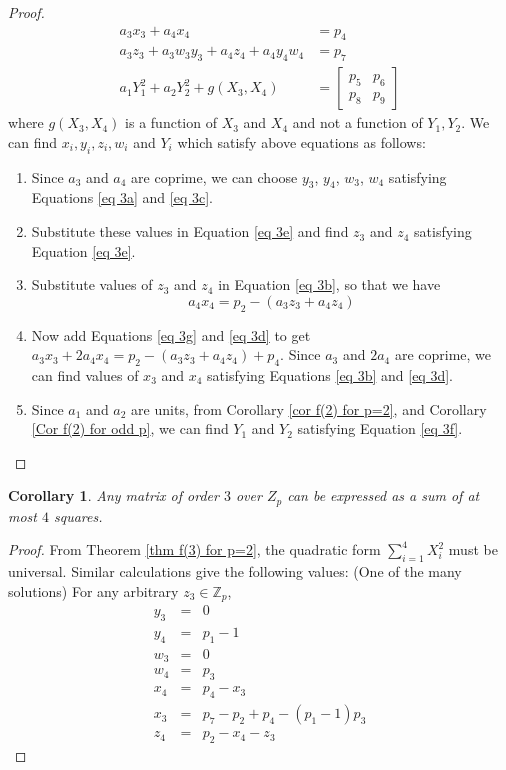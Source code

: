 \documentclass[12pt,a4paper]{article}
\newtheorem{cor}{Corollary}[section]
\begin{document}
\begin{proof}
\begin{subequations}
\begin{align}
					a_3x_3 + a_4x_4 &= p_4 \label{eq 3d} \\
					a_3z_3 + a_3w_3y_3 + a_4z_4 + a_4y_4w_4 &= p_7 \label{eq 3e} \\
					a_1Y_1^2 + a_2Y_2^2 + g(X_3, X_4) &= \begin{bmatrix}
						p_5 & p_6 \\
						p_8 & p_9
					\end{bmatrix} \label{eq 3f}
				\end{align}
			\end{subequations}
			where $g(X_3, X_4)$ is a function of $X_3$ and $X_4$ and not a function of $Y_1, Y_2$. We can find $x_i, y_i, z_i, w_i$ and $Y_i$ which satisfy above equations as follows:
			\begin{enumerate}
				\item[(a)] Since $a_3$ and $a_4$ are coprime, we can choose $y_3$, $y_4$, $w_3$, $w_4$ satisfying Equations \eqref{eq 3a} and \eqref{eq 3c}.
				\item[(b)] Substitute these values in Equation \eqref{eq 3e} and find $z_3$ and $z_4$ satisfying Equation \eqref{eq 3e}.
				\item[(c)] Substitute values of $z_3$ and $z_4$ in Equation \eqref{eq 3b}, so that we have
				\begin{equation}
					a_4x_4 = p_2-(a_3z_3+a_4z_4)  \label{eq 3g}
				\end{equation}
				\item[(d)] Now add Equations \eqref{eq 3g} and \eqref{eq 3d} to get $a_3x_3 + 2 a_4x_4 = p_2-(a_3z_3+a_4z_4) + p_4$. Since $a_3$ and $2a_4$ are coprime, we can find values of $x_3$ and $x_4$ satisfying Equations \eqref{eq 3b} and \eqref{eq 3d}.
				\item[(e)] Since $a_1$ and $a_2$ are units, from Corollary \ref{cor f(2) for p=2}, and Corollary \ref{Cor f(2) for odd p}, we can find $Y_1$ and $Y_2$ satisfying Equation \eqref{eq 3f}.
			\end{enumerate}
	\end{proof}
	\begin{cor}
		Any matrix of order $3$ over $Z_p$ can be expressed as a sum of at most $4$ squares.
	\end{cor}
	\begin{proof}
		From Theorem \ref{thm f(3) for p=2}, the quadratic form $\sum_{i=1}^{4} X_i^2$ must be universal. Similar calculations give the following values: (One of the many solutions) For any arbitrary $z_3 \in \mathbb{Z}_p$,
		\begin{eqnarray*}
			y_3&=& 0 \\
			y_4 &=& p_1-1 \\
			w_3&=& 0 \\
			w_4 &=& p_3 \\
			x_4 &=& p_4-x_3 \\
			x_3 &=& p_7-p_2+p_4-(p_1-1)p_3 \\
			z_4 &=& p_2-x_4-z_3
		\end{eqnarray*}
	\end{proof}
	
\end{document}
